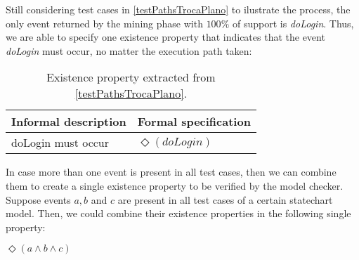 Still considering test cases in \ref{testPathsTrocaPlano} to ilustrate the process, the only event returned by the mining phase with $100\%$ of support is \textit{doLogin}. Thus, we are able to specify one existence property that indicates that the event \textit{doLogin} must occur, no matter the execution path taken:

\begin{table}[h]
\begin{center}
\begin{tabular}{|l | l|}

\hline

Informal description & Formal specification \\ \hline

doLogin must occur & $\Diamond (doLogin)$ \\

\hline
\end{tabular}
\end{center}
\caption{Existence property extracted from \ref{testPathsTrocaPlano}.}
\label{existencePropertyTrocaPlano}
\end{table}

In case more than one event is present in all test cases, then we can combine them to create a single existence property to be verified by the model checker. Suppose events $a, b$ and $c$ are present in all test cases of a certain statechart model. Then, we could combine their existence properties in the following single property:

\begin{center}
$\Diamond (a \wedge b \wedge c)$
\end{center}
